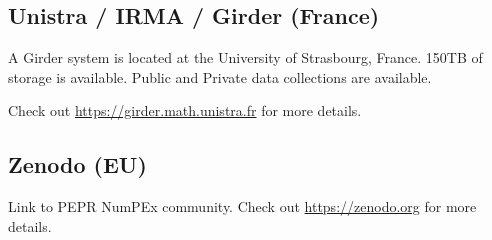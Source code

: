 \subsection*{Unistra / IRMA / Girder (France)}
\label{sec:arch:girder:unistra}

A Girder system is located at the University of Strasbourg, France.
150TB of storage is available.
Public and Private data collections are available.

Check out \url{https://girder.math.unistra.fr} for more details.

\subsection*{Zenodo (EU)}
\label{sec:arch:zenodo}


Link to PEPR NumPEx community.
Check out \url{https://zenodo.org} for more details.


